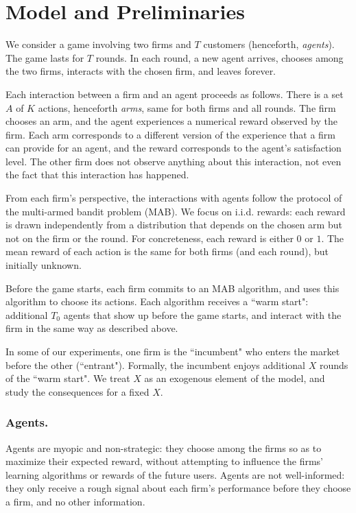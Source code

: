 \documentclass[../competing_bandits.tex]{subfiles}
\begin{document}
\section{Model and Preliminaries}\label{sec:model}

We consider a game involving two firms and $T$ customers (henceforth, \emph{agents}). The game lasts for $T$ rounds. In each round, a new agent arrives, chooses among the two firms, interacts with the chosen firm, and leaves forever. 

Each interaction between a firm and an agent proceeds as follows. There is a set $A$ of $K$ actions, henceforth \emph{arms}, same for both firms and all rounds. The firm chooses an arm, and the agent experiences a numerical reward observed by the firm. Each arm corresponds to a different version of the experience that a firm can provide for an agent, and the reward corresponds to the agent's satisfaction level. The other firm does not observe anything about this interaction, not even the fact that this interaction has happened.

From each firm's perspective, the interactions with agents follow the protocol of the multi-armed bandit problem (MAB). We focus on i.i.d. rewards: each reward is drawn independently from a distribution that depends on the chosen arm but not on the firm or the round. For concreteness, each reward is either $0$ or $1$. The mean reward of each action is the same for both firms (and each round), but initially unknown.  

Before the game starts, each firm commits to an MAB algorithm, and uses this algorithm to choose its actions. Each algorithm receives a ``warm start": additional $T_0$ agents that show up before the game starts, and interact with the firm in the same way as described above.

In some of our experiments, one firm is the ``incumbent" who enters the market before the other (``entrant"). Formally, the incumbent enjoys additional $X$ rounds of the ``warm start". We treat $X$ as an exogenous element of the model, and study the consequences for a fixed $X$. 


\subsubsection{Agents.}
Agents are myopic and non-strategic: they choose among the firms so as to maximize their expected reward, without attempting to influence the firms' learning algorithms or rewards of the future users. Agents are not well-informed: they only receive a rough signal about each firm's performance before they choose a firm, and no other information.
\end{document}
